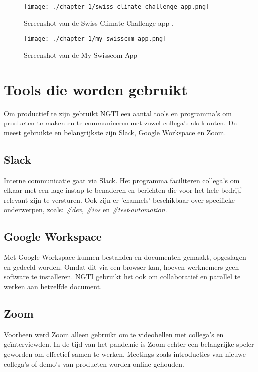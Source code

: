 \begin{figure}[hbt!]
  \centering
  \begin{minipage}{0.45\textwidth}
      \centering
      \texttt{[image: ./chapter-1/swiss-climate-challenge-app.png]}
      \caption{Screenshot van de Swiss Climate Challenge app \cite{ngti-swisscom-climate-challenge}.}
      \label{fig:swiss-climate-challenge-app}
  \end{minipage}\hfill
  \begin{minipage}{0.45\textwidth}
      \centering
      \texttt{[image: ./chapter-1/my-swisscom-app.png]}
      \caption{Screenshot van de My Swisscom App \cite{ngti-my-swisscom-app}}
      \label{fig:my-swisscom-app}
  \end{minipage}
\end{figure}


\section{Tools die worden gebruikt}\label{sec:tools-die-gebruikt-worden}
Om productief te zijn gebruikt NGTI een aantal tools en programma's om producten te maken en te communiceren met zowel collega's als klanten. De meest gebruikte en belangrijkste zijn Slack, Google Workspace en Zoom.

\subsection{Slack}\label{subsec:slack}
Interne communicatie gaat via Slack. Het programma faciliteren collega's om elkaar met een lage instap te benaderen en berichten die voor het hele bedrijf relevant zijn te versturen. Ook zijn er 'channels' beschikbaar over specifieke onderwerpen, zoals: \textit{\#dev}, \textit{\#ios} en \textit{\#test-automation}.

\subsection{Google Workspace}\label{subsec:google-workspace}
Met Google Workspace kunnen bestanden en documenten gemaakt, opgeslagen en gedeeld worden. Omdat dit via een browser kan, hoeven werknemers geen software te installeren. NGTI gebruikt het ook om collaboratief en parallel te werken aan hetzelfde document.

\subsection{Zoom}\label{subsec:zoom}
Voorheen werd Zoom alleen gebruikt om te videobellen met collega's en geïnterviewden. In de tijd van het pandemie is Zoom echter een belangrijke speler geworden om effectief samen te werken. Meetings zoals introducties van nieuwe collega's of demo's van producten worden online gehouden.

